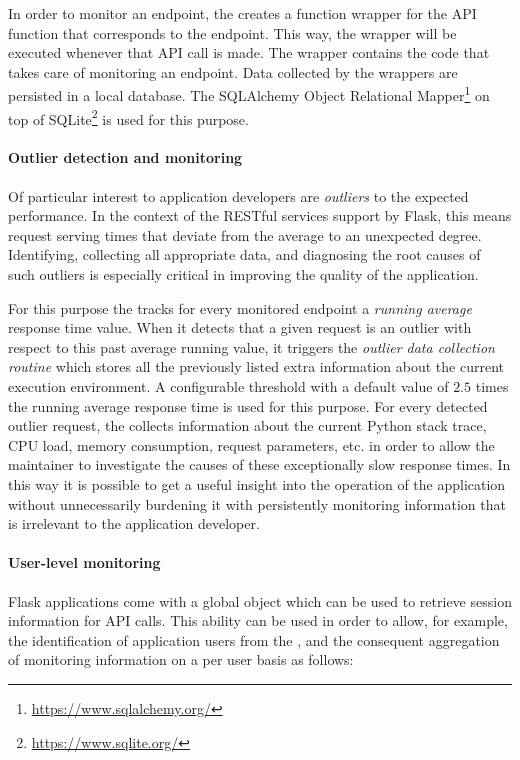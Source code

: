 \documentclass{sig-alternate-05-2015}
\begin{document}
  In order to monitor an endpoint, the \tool creates a function wrapper for the API function that corresponds to the endpoint. This way, the wrapper will be executed whenever that API call is made. The wrapper contains the code that takes care of monitoring an endpoint. Data collected by the wrappers are persisted in a local database. The SQLAlchemy Object Relational Mapper\footnote{\url{https://www.sqlalchemy.org/}} on top of SQLite\footnote{\url{https://www.sqlite.org/}} is used for this purpose.
  
  \paragraph{Outlier detection and monitoring}
  
  Of particular interest to application developers are {\em outliers} to the expected performance. In the context of the RESTful services support by Flask, this means request serving times that deviate from the average to an unexpected degree. Identifying, collecting all appropriate data, and diagnosing the root causes of such outliers is especially critical in improving the quality of the application. 
  
  For this purpose the \tool tracks for every monitored endpoint a {\em running average} response time value. When it detects that a given request is an outlier with respect to this past average running value, it triggers the {\em outlier data collection routine} which stores all the previously listed extra information about the current execution environment. A configurable threshold with a default value of $2.5$ times the running average response time is used for this purpose. For every detected outlier request, the \tool collects information about the current Python stack trace, CPU load, memory consumption, request parameters, etc. in order to allow the maintainer to investigate the causes of these exceptionally slow response times. In this way it is possible to get a useful insight into the operation of the application without unnecessarily burdening it with persistently monitoring information that is irrelevant to the application developer.
  
  \paragraph{User-level monitoring}
  
  Flask applications come with a global  object which can be used to retrieve session information for API calls. This ability can be used in order to allow, for example, the identification of application users from the \tool, and the consequent aggregation of monitoring information on a per user basis as follows: 
  
\end{document}
